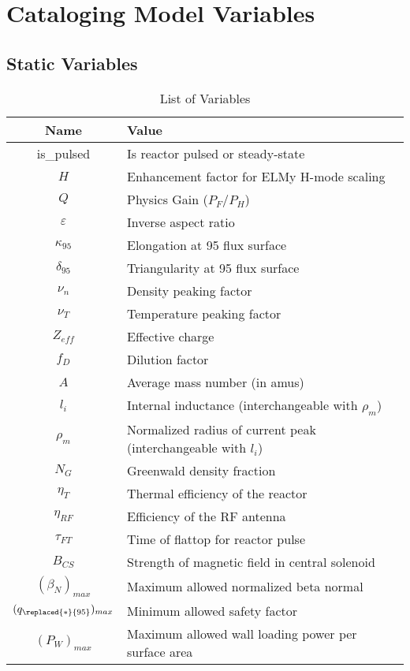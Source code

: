 \chapter{Cataloging Model Variables}

\section{Static Variables}

\label{chapter:var_table}

\begin{table}[h]
\centering
\caption{List of  Variables}
\begin{tabular}{c|l}
\textbf{Name} & \textbf{Value} \\
\hline
is\_pulsed & Is reactor pulsed or steady-state \\
$H$ & Enhancement factor for ELMy H-mode scaling \\
$Q$ & Physics Gain ($P_F/P_H$) \\
$\varepsilon$ & Inverse aspect ratio \\
$\kappa_{95}$ &  Elongation at 95 flux surface \\
$\delta_{95}$ &  Triangularity at 95 flux surface \\
$\nu_n$ &  Density peaking factor \\
$\nu_T$ &  Temperature peaking factor \\
$Z_{eff}$ & Effective charge \\
$f_D$ & Dilution factor \\
$A$ & Average mass number (in amus) \\
$l_i$ & Internal inductance (interchangeable with $\rho_m$) \\
$\rho_m$ & Normalized radius of current peak (interchangeable with $l_i$) \\
$N_G$ & Greenwald density fraction \\
$\eta_T$ & Thermal efficiency of the reactor \\
$\eta_{RF}$ &  Efficiency of the RF antenna \\
$\tau_{FT}$ &  Time of flattop for reactor pulse \\
$B_{CS}$ &  Strength of magnetic field in central solenoid \\
$(\beta_N)_{max}$ &  Maximum allowed normalized beta normal \\
$(q_{\replaced{*}{95}})_{max}$ & Minimum allowed safety factor \\
$(P_W)_{max}$ & Maximum allowed wall loading power per surface area
\end{tabular}
\end{table}

